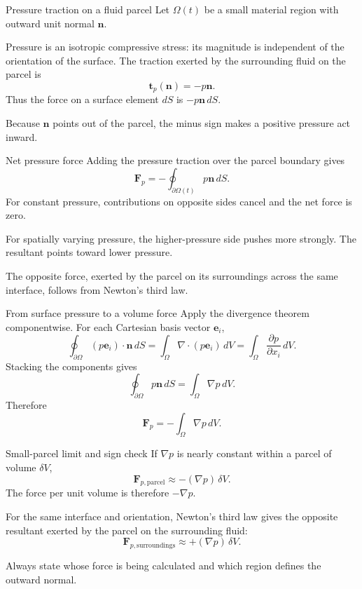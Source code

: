 \documentclass[aspectratio=169,11pt]{beamer}
\newcommand{\nvec}{\bm{n}}
\newcommand{\tvec}{\bm{t}}
\begin{document}
\begin{frame}{Pressure traction on a fluid parcel}
Let $\Omega(t)$ be a small material region with outward unit normal $\nvec$.

\medskip
Pressure is an isotropic compressive stress: its magnitude is independent of the orientation of the surface. The traction exerted by the surrounding fluid on the parcel is
\[
  \boxed{\tvec_p(\nvec)=-p\nvec}.
\]
Thus the force on a surface element $dS$ is $-p\nvec\,dS$.

\begin{punchbox}
\small Because $\nvec$ points out of the parcel, the minus sign makes a positive pressure act inward.
\end{punchbox}
\end{frame}

\begin{frame}{Net pressure force}
Adding the pressure traction over the parcel boundary gives
\[
  \boxed{
  \mathbf{F}_p=-\oint_{\partial\Omega(t)}p\nvec\,dS}.
\]
For constant pressure, contributions on opposite sides cancel and the net force is zero.

\medskip
For spatially varying pressure, the higher-pressure side pushes more strongly. The resultant points toward lower pressure.

\begin{punchbox}
\small The opposite force, exerted by the parcel on its surroundings across the same interface, follows from Newton's third law.
\end{punchbox}
\end{frame}

\begin{frame}{From surface pressure to a volume force}
Apply the divergence theorem componentwise. For each Cartesian basis vector $\bm e_i$,
\[
  \oint_{\partial\Omega}(p\bm e_i)\cdot\nvec\,dS
  =\int_\Omega\nabla\cdot(p\bm e_i)\,dV
  =\int_\Omega\frac{\partial p}{\partial x_i}\,dV.
\]
Stacking the components gives
\[
  \oint_{\partial\Omega}p\nvec\,dS
  =\int_\Omega\nabla p\,dV.
\]
Therefore
\[
  \boxed{\mathbf{F}_p=-\int_\Omega\nabla p\,dV}.
\]
\end{frame}

\begin{frame}{Small-parcel limit and sign check}
If $\nabla p$ is nearly constant within a parcel of volume $\delta V$,
\[
  \boxed{\mathbf{F}_{p,\mathrm{parcel}}
  \approx-(\nabla p)\,\delta V}.
\]
The force per unit volume is therefore $-\nabla p$.

\medskip
For the same interface and orientation, Newton's third law gives the opposite resultant exerted by the parcel on the surrounding fluid:
\[
  \mathbf{F}_{p,\mathrm{surroundings}}
  \approx+(\nabla p)\,\delta V.
\]
\begin{punchbox}
\small Always state whose force is being calculated and which region defines the outward normal.
\end{punchbox}
\end{frame}
\end{document}
